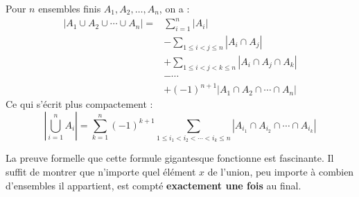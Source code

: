 \begin{theorembox}
Pour $n$ ensembles finis $A_1, A_2, \dots, A_n$, on a :
\begin{align*}
|A_1 \cup A_2 \cup \cdots \cup A_n| = & \sum_{i=1}^n |A_i| \\
& - \sum_{1 \leq i < j \leq n} |A_i \cap A_j| \\
& + \sum_{1 \leq i < j < k \leq n} |A_i \cap A_j \cap A_k| \\
& - \cdots \\
& + (-1)^{n+1} |A_1 \cap A_2 \cap \cdots \cap A_n|
\end{align*}
Ce qui s'écrit plus compactement :
$$ \left| \bigcup_{i=1}^n A_i \right| = \sum_{k=1}^n (-1)^{k+1} \sum_{1 \leq i_1 < i_2 < \cdots < i_k \leq n} |A_{i_1} \cap A_{i_2} \cap \cdots \cap A_{i_k}| $$
\end{theorembox}

La preuve formelle que cette formule gigantesque fonctionne est fascinante. Il suffit de montrer que n'importe quel élément $x$ de l'union, peu importe à combien d'ensembles il appartient, est compté \textbf{exactement une fois} au final.

